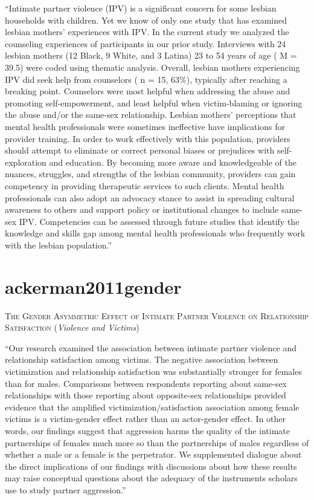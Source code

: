 \documentclass[]{tufte-handout}
\begin{document}
``Intimate partner violence (IPV) is a significant concern for some
lesbian households with children. Yet we know of only one study that has
examined lesbian mothers' experiences with IPV. In the current study we
analyzed the counseling experiences of participants in our prior study.
Interviews with 24 lesbian mothers (12 Black, 9 White, and 3 Latina) 23
to 54 years of age ( M = 39.5) were coded using thematic analysis.
Overall, lesbian mothers experiencing IPV did seek help from counselors
( n = 15, 63\%), typically after reaching a breaking point. Counselors
were most helpful when addressing the abuse and promoting
self-empowerment, and least helpful when victim-blaming or ignoring the
abuse and/or the same-sex relationship. Lesbian mothers' perceptions
that mental health professionals were sometimes ineffective have
implications for provider training. In order to work effectively with
this population, providers should attempt to eliminate or correct
personal biases or prejudices with self-exploration and education. By
becoming more aware and knowledgeable of the nuances, struggles, and
strengths of the lesbian community, providers can gain competency in
providing therapeutic services to such clients. Mental health
professionals can also adopt an advocacy stance to assist in spreading
cultural awareness to others and support policy or institutional changes
to include same-sex IPV. Competencies can be assessed through future
studies that identify the knowledge and skills gap among mental health
professionals who frequently work with the lesbian population.''

\section{\texorpdfstring{\textcolor[HTML]{5b0057}{ackerman2011gender}}{}}\label{section-42}

\textsc{\large{The Gender Asymmetric Effect of Intimate Partner Violence on Relationship Satisfaction}}
(\emph{Violence and Victims})

``Our research examined the association between intimate partner
violence and relationship satisfaction among victims. The negative
association between victimization and relationship satisfaction was
substantially stronger for females than for males. Comparisons between
respondents reporting about same-sex relationships with those reporting
about opposite-sex relationships provided evidence that the amplified
victimization/satisfaction association among female victims is a
victim-gender effect rather than an actor-gender effect. In other words,
our findings suggest that aggression harms the quality of the intimate
partnerships of females much more so than the partnerships of males
regardless of whether a male or a female is the perpetrator. We
supplemented dialogue about the direct implications of our findings with
discussions about how these results may raise conceptual questions about
the adequacy of the instruments scholars use to study partner
aggression.''
\end{document}
